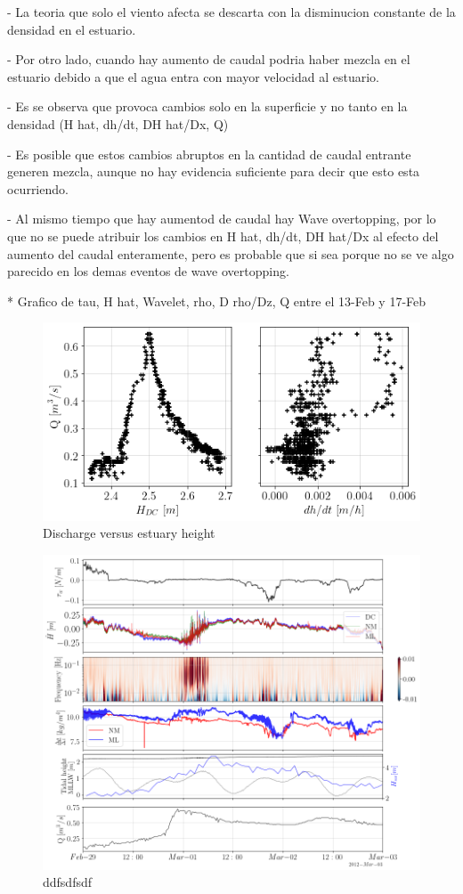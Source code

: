 \documentclass[tesis.tex]{subfiles}
\begin{document}
- La teoria que solo el viento afecta se descarta con la disminucion constante de la densidad en el estuario.

- Por otro lado, cuando hay aumento de caudal podria haber mezcla en el estuario debido a que el agua entra con mayor velocidad al estuario.

- Es se observa que provoca cambios solo en la superficie y no tanto en la densidad (H hat, dh/dt, DH hat/Dx, Q)

- Es posible que estos cambios abruptos en la cantidad de caudal entrante generen mezcla, aunque no hay evidencia suficiente para decir que esto esta ocurriendo.

- Al mismo tiempo que hay aumentod de caudal hay Wave overtopping, por lo que no se puede atribuir los cambios en H hat, dh/dt, DH hat/Dx al efecto del aumento del caudal enteramente, pero es probable que si sea porque no se ve algo parecido en los demas eventos de wave overtopping.

* Grafico de tau, H hat, Wavelet, rho, D rho/Dz, Q entre el 13-Feb y 17-Feb

\begin{figure}[h!]
    \centering
    \includegraphics[width=\textwidth]{Imagenes/qh.png}
    \caption{Discharge versus estuary height }
    \label{fig:qh}
\end{figure}


\begin{figure}[h!]
    \centering
    \includegraphics[width=\textwidth]{Imagenes/mix_q.png}
    \caption{ddfsdfsdf }
    \label{fig:mix_q}
\end{figure}
\end{document}
